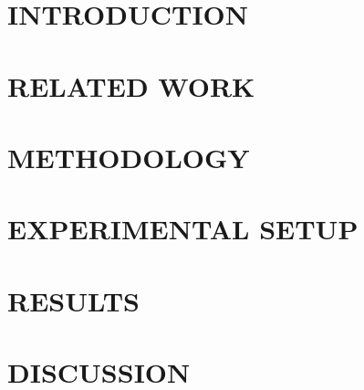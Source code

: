 \documentclass[12pt,a4paper]{report}
\begin{document}
\chapter{INTRODUCTION}



\chapter{RELATED WORK}



\chapter{METHODOLOGY}



\chapter{EXPERIMENTAL SETUP}



\chapter{RESULTS}



\chapter{DISCUSSION}



\end{document}
